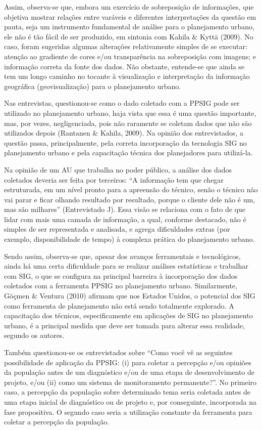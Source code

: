 \documentclass{article}
\begin{document}
Assim, observa-se que, embora um exercício de sobreposição de informações, que
objetiva mostrar relações entre varáveis e diferentes interpretações da questão
em pauta, seja um instrumento fundamental de análise para o planejamento urbano,
ele não é tão fácil de ser produzido, em sintonia com Kahila \& Kyttä (2009). No
caso, foram sugeridas
algumas alterações relativamente simples de se executar: atenção ao gradiente de
cores e/ou transparência na sobreposição com imagens; e informação correta da
fonte dos dados. Não obstante, entende-se que ainda se tem um longo caminho no
tocante à visualização e interpretação da informação geográfica
(geovisualização) para o planejamento urbano.

Nas entrevistas, questionou-se como o dado coletado com a PPSIG pode ser
utilizado no planejamento urbano, haja vista que essa é uma questão importante,
mas, por vezes, negligenciada, pois não raramente se coletam dados que não são
utilizados depois (Rantanen \& Kahila,
2009). Na opinião dos entrevistados, a questão passa, principalmente,
pela correta incorporação da tecnologia SIG no planejamento urbano e pela
capacitação técnica dos planejadores para utilizá-la.

Na opinião de um AU que trabalha no poder público, a análise dos dados coletados
deveria ser feita por terceiros: “A informação tem que chegar
estruturada, em um nível pronto para a apreensão do técnico, senão o técnico
não vai parar e ficar olhando resultado por resultado, porque o cliente dele
não é um, mas são milhares” (Entrevistado J). Essa visão se
relaciona com o fato de que lidar com mais uma camada de informação, a qual,
conforme destacado, não é simples de ser representada e analisada, e agrega
dificuldades extras (por exemplo, disponibilidade de tempo) à complexa prática
do planejamento urbano.

Sendo assim, observa-se que, apesar dos avanços ferramentais e tecnológicos,
ainda há uma certa dificuldade para se realizar análises estatísticas e
trabalhar com SIG, o que se configura na principal barreira à incorporação dos
dados coletados com a ferramenta PPSIG no planejamento urbano. Similarmente,
Göçmen \& Ventura (2010) afirmam
que nos Estados Unidos, o potencial dos SIG como ferramenta de planejamento não
está sendo totalmente explorado. A capacitação dos técnicos, especificamente em
aplicações de SIG no planejamento urbano, é a principal medida que deve ser
tomada para alterar essa realidade, segundo os autores.

Também questionou-se os entrevistados sobre “Como você vê as seguintes
possibilidade de aplicação da PPSIG: (i) para coletar a percepção e/ou
opiniões da população antes de um diagnóstico e/ou de uma etapa de
desenvolvimento de projeto, e/ou (ii) como um sistema de monitoramento
permanente?”. No primeiro caso, a percepção da população sobre
determinado tema seria coletada antes de uma etapa inicial de diagnóstico ou de
projeto e, por conseguinte, incorporada na fase propositiva. O segundo caso
seria a utilização constante da ferramenta para coletar a percepção da
população.
\end{document}
